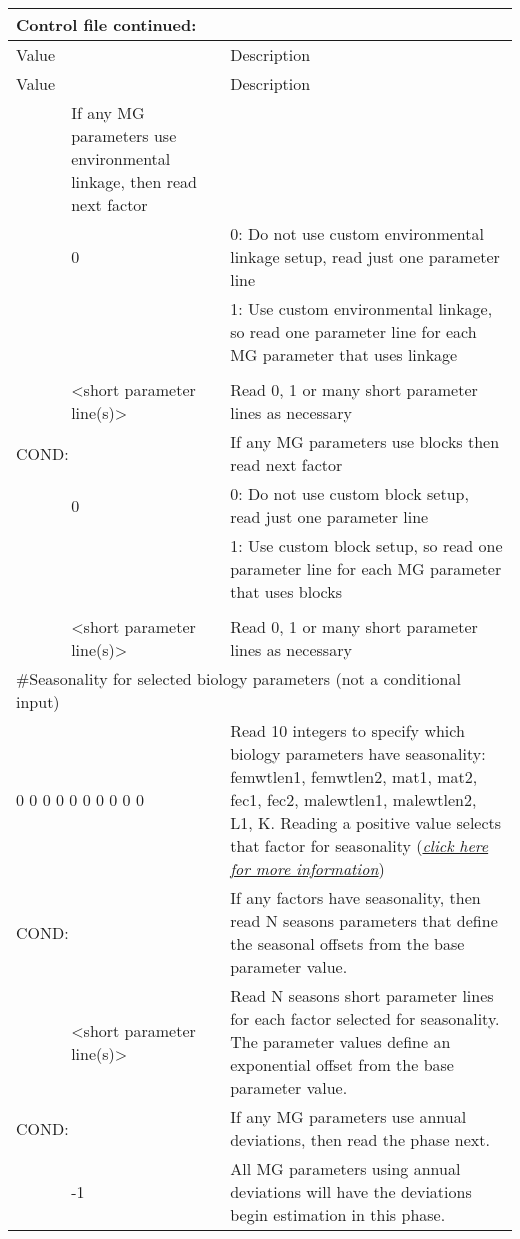 \begin{center}
	\begin{longtable}{p{0.5cm} p{2.5cm} p{11cm}}
		\multicolumn{3}{l}{Control file continued:}\\
		\hline
		Value & &  Description\\
		\hline
		\endfirsthead

		\hline
		Value & &  Description\\
		\hline
		\endhead

		\endfoot
		\endlastfoot

		\multicolumn{2}{l}{COND:} & If any MG parameters use environmental linkage, then read next factor\\
		& 0 & 0:  Do not use custom environmental linkage setup, read just one parameter line \\
		&   & 1:  Use custom environmental linkage, so read one parameter line for each MG parameter that uses linkage\\
		\\
		& <short parameter line(s)> & Read 0, 1 or many short parameter lines as necessary\\
		\hline
		\multicolumn{2}{l}{COND:} & If any MG parameters use blocks then read next factor \\
		& 0 & 0:  Do not use custom block setup, read just one parameter line \\
		&   & 1:  Use custom block setup, so read one parameter line for each MG parameter that uses blocks\\
		\\
		& <short parameter line(s)> & Read 0, 1 or many short parameter lines as necessary\\
		\hline
		\multicolumn{3}{l}{\#Seasonality for selected biology parameters (not a conditional input)}\\
		\multicolumn{2}{l}{0 0 0 0 0 0 0 0 0 0} & Read 10 integers to specify which biology parameters have seasonality:  femwtlen1, femwtlen2, mat1, mat2, fec1, fec2, malewtlen1, malewtlen2, L1, K.  Reading a positive value selects that factor for seasonality (\hyperlink{SeasGrowth}{\textit{click here for more information}})\\
		\hline
		\multicolumn{2}{l}{COND:} & If any factors have seasonality, then read N seasons parameters that define the seasonal offsets from the base parameter value.\\
		& <short parameter line(s)> & Read N seasons short parameter lines for each factor selected for seasonality.
		The parameter values define an exponential offset from the base parameter value.\\
		\hline
		\multicolumn{2}{l}{COND:} & If any MG parameters use annual deviations, then read the phase next. \\
		& -1 & All MG parameters using annual deviations will have the deviations begin estimation in this phase.\\
		\hline
	\end{longtable}
\end{center}


